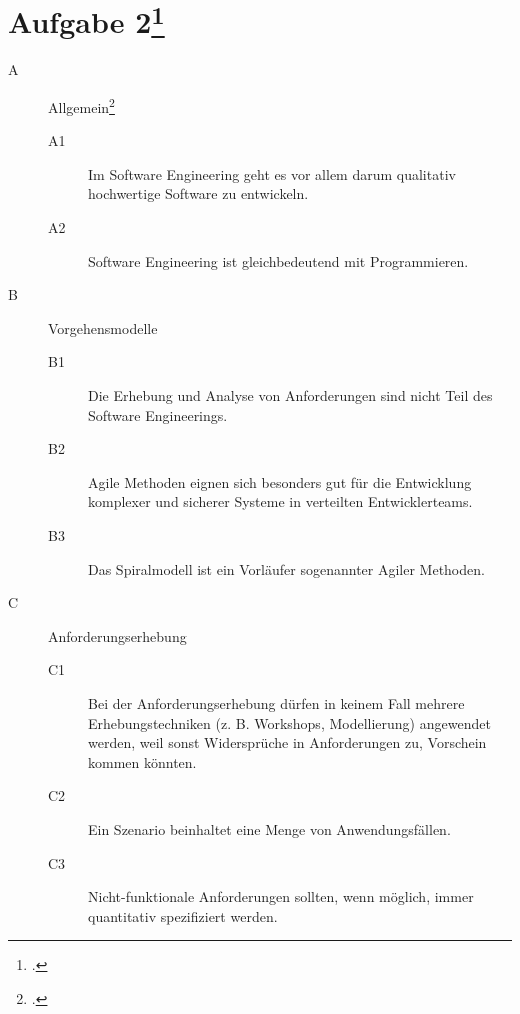 \documentclass{lehramt-informatik}
\begin{document}
\section{Aufgabe 2\footcite{sosy:ab:9}}

\begin{description}

%

\item[A] Allgemein\footcite[Herbst 2016 (66116) - Thema 2, Teilaufgabe 2, Aufgabe 1a]{examen:66116:2016:09}

\begin{description}
\item[A1] Im Software Engineering geht es vor allem darum qualitativ
hochwertige Software zu entwickeln.

\item[A2] Software Engineering ist gleichbedeutend mit Programmieren.
\end{description}

%

\item[B] Vorgehensmodelle

\begin{description}
\item[B1] Die Erhebung und Analyse von Anforderungen sind nicht Teil des
Software Engineerings.

\item[B2] Agile Methoden eignen sich besonders gut für die Entwicklung
komplexer und sicherer Systeme in verteilten Entwicklerteams.

\item[B3] Das Spiralmodell ist ein Vorläufer sogenannter Agiler
Methoden.
\end{description}

%

\item[C] Anforderungserhebung

\begin{description}
\item[C1] Bei der Anforderungserhebung dürfen in keinem Fall mehrere
Erhebungstechniken (z. B. Workshops, Modellierung) angewendet werden,
weil sonst Widersprüche in Anforderungen zu, Vorschein kommen könnten.

\item[C2] Ein Szenario beinhaltet eine Menge von Anwendungsfällen.

\item[C3] Nicht-funktionale Anforderungen sollten, wenn möglich, immer
quantitativ spezifiziert werden.
\end{description}


\end{description}
\end{document}
